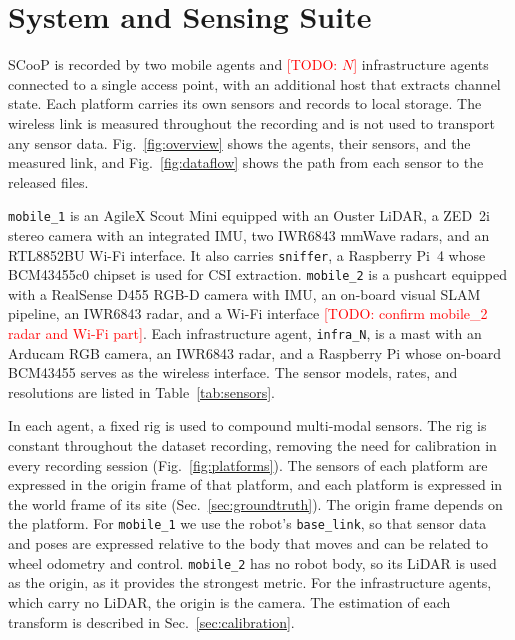 \documentclass[conference]{IEEEtran}
\newcommand{\todo}[1]{\textcolor{red}{[TODO: #1]}}
\begin{document}
\section{System and Sensing Suite}
\label{sec:system}
SCooP is recorded by two mobile agents and \todo{$N$} infrastructure
agents connected to a single access point, with an additional host
that extracts channel state. Each platform carries its own sensors
and records to local storage. The wireless link is measured
throughout the recording and is not used to transport any sensor
data. Fig.~\ref{fig:overview} shows the agents, their sensors, and the
measured link, and Fig.~\ref{fig:dataflow} shows the path from each
sensor to the released files.



\texttt{mobile\_1} is an AgileX Scout Mini equipped with an Ouster
LiDAR, a ZED~2i stereo camera with an integrated IMU, two IWR6843
mmWave radars, and an RTL8852BU Wi-Fi interface. It also carries
\texttt{sniffer}, a Raspberry Pi~4 whose BCM43455c0 chipset is used
for CSI extraction. \texttt{mobile\_2} is a pushcart equipped with a
RealSense D455 RGB-D camera with IMU, an on-board visual SLAM
pipeline, an IWR6843 radar, and a Wi-Fi interface \todo{confirm
mobile\_2 radar and Wi-Fi part}. Each infrastructure agent,
\texttt{infra\_N}, is a mast with an Arducam RGB camera, an IWR6843
radar, and a Raspberry Pi whose on-board BCM43455 serves as the
wireless interface. The sensor models, rates, and resolutions are
listed in Table~\ref{tab:sensors}.

In each agent, a fixed rig is used to compound multi-modal sensors.
The rig is constant throughout the dataset recording, removing the
need for calibration in every recording session
(Fig.~\ref{fig:platforms}). The sensors of each platform are
expressed in the origin frame of that platform, and each platform is
expressed in the world frame of its site
(Sec.~\ref{sec:groundtruth}). The origin frame depends on the
platform. For \texttt{mobile\_1} we use the robot's
\texttt{base\_link}, so that sensor data and poses are expressed
relative to the body that moves and can be related to wheel odometry
and control. \texttt{mobile\_2} has no robot body, so its LiDAR is
used as the origin, as it provides the strongest metric. For the
infrastructure agents, which carry no LiDAR, the origin is the
camera. The estimation of each transform is described in
Sec.~\ref{sec:calibration}.
\end{document}
